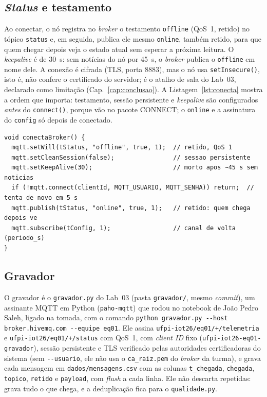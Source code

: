 \subsection{\emph{Status} e testamento}

Ao conectar, o nó registra no \emph{broker} o testamento
\texttt{offline} (QoS~1, retido) no tópico \texttt{status} e, em seguida,
publica ele mesmo \texttt{online}, também retido, para que quem chegar
depois veja o estado atual sem esperar a próxima leitura. O
\emph{keepalive} é de \SI{30}{\second}: sem notícias do nó por
\SI{45}{\second}, o \emph{broker} publica o \texttt{offline} em nome
dele. A conexão é cifrada (TLS, porta 8883), mas o nó usa
\texttt{setInsecure()}, isto é, não confere o certificado do servidor;
é o atalho de sala do Lab~03, declarado como limitação
(Cap.~\ref{cap:conclusao}). A Listagem~\ref{lst:conecta} mostra a
ordem que importa: testamento, sessão persistente e \emph{keepalive}
são configurados \emph{antes} do \texttt{connect()}, porque vão no
pacote CONNECT; o \texttt{online} e a assinatura do \texttt{config} só
depois de conectado.

\begin{lstlisting}[style=arduino,
  caption={Conexão ao \emph{broker}: testamento, sessão persistente e \emph{keepalive} (\texttt{sketch.ino}, \emph{commit} \texttt{7b4482e}; mensagens de diagnóstico omitidas)},
  label={lst:conecta}]
void conectaBroker() {
  mqtt.setWill(tStatus, "offline", true, 1);  // retido, QoS 1
  mqtt.setCleanSession(false);                // sessao persistente
  mqtt.setKeepAlive(30);                      // morto apos ~45 s sem noticias
  if (!mqtt.connect(clientId, MQTT_USUARIO, MQTT_SENHA)) return;  // tenta de novo em 5 s
  mqtt.publish(tStatus, "online", true, 1);   // retido: quem chega depois ve
  mqtt.subscribe(tConfig, 1);                 // canal de volta (periodo_s)
}
\end{lstlisting}

\subsection{Gravador}

O gravador é o \texttt{gravador.py} do Lab~03 (pasta
\texttt{gravador/}, mesmo \emph{commit}), um assinante MQTT em Python
(\texttt{paho-mqtt}) que rodou no notebook de João Pedro Saleh, ligado
na tomada, com o comando
\texttt{python gravador.py -{}-host broker.hivemq.com -{}-equipe eq01}.
Ele assina \texttt{ufpi-iot26/eq01/+/telemetria} e \texttt{ufpi-iot26/eq01/+/status}
com QoS~1, com \emph{client ID} fixo (\texttt{ufpi-iot26-eq01-gravador}),
sessão persistente e TLS verificado pelas autoridades certificadoras do
sistema (sem \texttt{-{}-usuario}, ele não usa o \texttt{ca\_raiz.pem} do
\emph{broker} da turma), e grava cada mensagem em
\texttt{dados/mensagens.csv} com as colunas \texttt{t\_chegada},
\texttt{chegada}, \texttt{topico}, \texttt{retido} e \texttt{payload},
com \emph{flush} a cada linha. Ele não descarta repetidas: grava tudo o
que chega, e a deduplicação fica para o \texttt{qualidade.py}.

